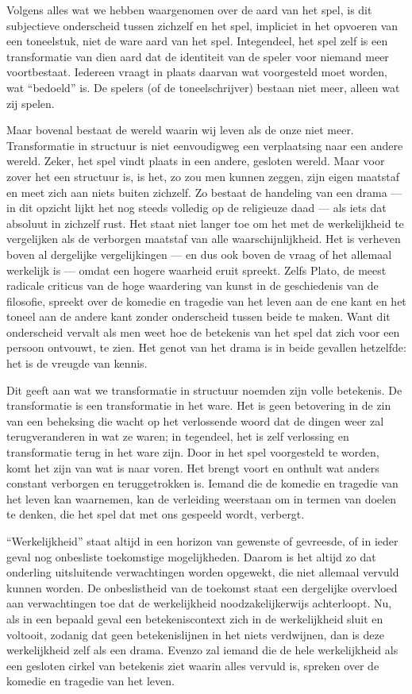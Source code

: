 Volgens alles wat we hebben waargenomen over de aard van het spel, is dit subjectieve onderscheid tussen zichzelf en het spel, impliciet in het opvoeren van een toneelstuk, niet de ware aard van het spel. Integendeel, het spel zelf is een transformatie van dien aard dat de identiteit van de speler voor niemand meer voortbestaat. Iedereen vraagt in plaats daarvan wat voorgesteld moet worden, wat ``bedoeld'' is. De spelers (of de toneelschrijver) bestaan niet meer, alleen wat zij spelen.

Maar bovenal bestaat de wereld waarin wij leven als de onze niet meer. Transformatie in structuur is niet eenvoudigweg een verplaatsing naar een andere wereld. Zeker, het spel vindt plaats in een andere, gesloten wereld. Maar voor zover het een structuur is, is het, zo zou men kunnen zeggen, zijn eigen maatstaf en meet zich aan niets buiten zichzelf. Zo bestaat de handeling van een drama — in dit opzicht lijkt het nog steeds volledig op de religieuze daad — als iets dat absoluut in zichzelf rust. Het staat niet langer toe om het met de werkelijkheid te vergelijken als de verborgen maatstaf van alle waarschijnlijkheid. Het is verheven boven al dergelijke vergelijkingen — en dus ook boven de vraag of het allemaal werkelijk is — omdat een hogere waarheid eruit spreekt. Zelfs Plato, de meest radicale criticus van de hoge waardering van kunst in de geschiedenis van de filosofie, spreekt over de komedie en tragedie van het leven aan de ene kant en het toneel aan de andere kant zonder onderscheid tussen beide te maken. Want dit onderscheid vervalt als men weet hoe de betekenis van het spel dat zich voor een persoon ontvouwt, te zien. Het genot van het drama is in beide gevallen hetzelfde: het is de vreugde van kennis.

Dit geeft aan wat we transformatie in structuur noemden zijn volle betekenis. De transformatie is een transformatie in het ware. Het is geen betovering in de zin van een beheksing die wacht op het verlossende woord dat de dingen weer zal terugveranderen in wat ze waren; in tegendeel, het is zelf verlossing en transformatie terug in het ware zijn. Door in het spel voorgesteld te worden, komt het zijn van wat is naar voren. Het brengt voort en onthult wat anders constant verborgen en teruggetrokken is. Iemand die de komedie en tragedie van het leven kan waarnemen, kan de verleiding weerstaan om in termen van doelen te denken, die het spel dat met ons gespeeld wordt, verbergt.

``Werkelijkheid'' staat altijd in een horizon van gewenste of gevreesde, of in ieder geval nog onbesliste toekomstige mogelijkheden. Daarom is het altijd zo dat onderling uitsluitende verwachtingen worden opgewekt, die niet allemaal vervuld kunnen worden. De onbeslistheid van de toekomst staat een dergelijke overvloed aan verwachtingen toe dat de werkelijkheid noodzakelijkerwijs achterloopt. Nu, als in een bepaald geval een betekeniscontext zich in de werkelijkheid sluit en voltooit, zodanig dat geen betekenislijnen in het niets verdwijnen, dan is deze werkelijkheid zelf als een drama. Evenzo zal iemand die de hele werkelijkheid als een gesloten cirkel van betekenis ziet waarin alles vervuld is, spreken over de komedie en tragedie van het leven.


